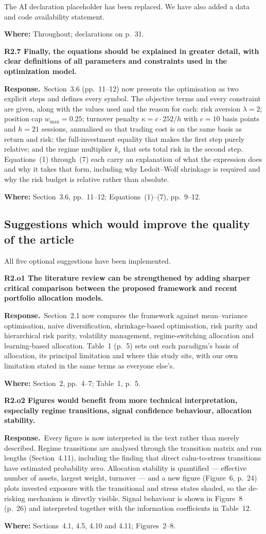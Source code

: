 \documentclass[11pt,a4paper]{article}
\newcommand{\rc}[1]{\par\medskip\noindent\textbf{#1}\par\nopagebreak}
\newcommand{\resp}{\par\noindent\textbf{Response.}\ }
\newcommand{\where}[1]{\par\smallskip\noindent\textcolor{blue!55!black}{\textbf{Where:} #1}\par}
\begin{document}
The AI declaration placeholder has been replaced. We have also added a data and code
availability statement.
\where{Throughout; declarations on p.~31.}

\rc{R2.7 Finally, the equations should be explained in greater detail, with clear
definitions of all parameters and constraints used in the optimization model.}

\resp Section~3.6 (pp.~11--12) now presents the optimisation as two explicit steps and
defines every symbol. The objective terms and every constraint are given, along with the
values used and the reason for each: risk aversion $\lambda = 2$; position cap
$w_{\max} = 0.25$; turnover penalty $\kappa = c \cdot 252 / h$ with $c = 10$ basis points
and $h = 21$ sessions, annualised so that trading cost is on the same basis as return
and risk; the full-investment equality that makes the first step purely relative; and
the regime multiplier $k_r$ that sets total risk in the second step. Equations~(1)
through~(7) each carry an explanation of what the expression does and why it takes that
form, including why Ledoit--Wolf shrinkage is required and why the risk budget is
relative rather than absolute.
\where{Section~3.6, pp.~11--12; Equations~(1)--(7), pp.~9--12.}

\subsection*{Suggestions which would improve the quality of the article}

All five optional suggestions have been implemented.

\rc{R2.o1 The literature review can be strengthened by adding sharper critical
comparison between the proposed framework and recent portfolio allocation models.}

\resp Section~2.1 now compares the framework against mean--variance optimisation, naive
diversification, shrinkage-based optimisation, risk parity and hierarchical risk parity,
volatility management, regime-switching allocation and learning-based allocation.
Table~1 (p.~5) sets out each paradigm's basis of allocation, its principal limitation
and where this study sits, with our own limitation stated in the same terms as everyone
else's.
\where{Section~2, pp.~4--7; Table~1, p.~5.}

\rc{R2.o2 Figures would benefit from more technical interpretation, especially regime
transitions, signal confidence behaviour, allocation stability.}

\resp Every figure is now interpreted in the text rather than merely described.
Regime transitions are analysed through the transition matrix and run lengths
(Section~4.11), including the finding that direct calm-to-stress transitions have
estimated probability zero. Allocation stability is quantified --- effective number of
assets, largest weight, turnover --- and a new figure (Figure~6, p.~24) plots invested
exposure with the transitional and stress states shaded, so the de-risking mechanism is
directly visible. Signal behaviour is shown in Figure~8 (p.~26) and interpreted together
with the information coefficients in Table~12.
\where{Sections~4.1, 4.5, 4.10 and 4.11; Figures~2--8.}
\end{document}
